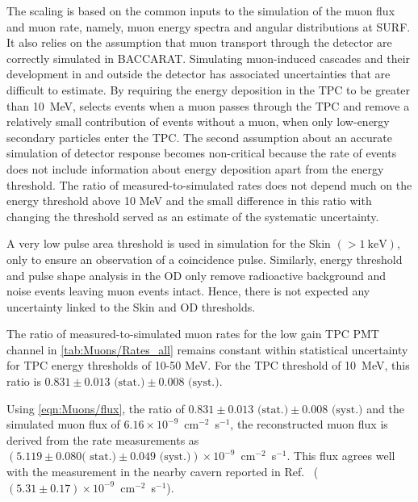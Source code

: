 The scaling is based on the common inputs to the simulation of the muon flux and muon rate, namely, muon energy spectra and angular distributions at SURF. It also relies on the assumption that muon transport through the detector are correctly simulated in BACCARAT. Simulating muon-induced cascades and their development in and outside the detector has associated uncertainties that are difficult to estimate. By requiring the energy deposition in the TPC to be greater than 10~MeV, selects events when a muon passes through the TPC and remove a relatively small contribution of events without a muon, when only low-energy secondary particles enter the TPC. 
The second assumption about an accurate simulation of detector response becomes non-critical because the rate of events does not include information about energy deposition apart from the energy threshold. The ratio of measured-to-simulated rates does not depend much on the energy threshold above 10 MeV and the small difference in this ratio with changing the threshold served as an estimate of the systematic uncertainty. 

A very low pulse area threshold is used in simulation for the Skin $(>1~\text{keV})$, only to ensure an observation of a coincidence pulse. Similarly, energy threshold and pulse shape analysis in the OD only remove radioactive background and noise events leaving muon events intact. Hence, there is not expected any uncertainty linked to the Skin and OD thresholds.

The ratio of measured-to-simulated muon rates for the low gain TPC PMT channel in \autoref{tab:Muons/Rates_all} remains constant within statistical uncertainty for TPC energy thresholds of 10-50 MeV. For the TPC threshold of 10~MeV, this ratio is $0.831 \pm 0.013 \textrm{ (stat.)} \pm 0.008 \textrm{ (syst.)}$. 

Using \autoref{eqn:Muons/flux}, the ratio of $0.831 \pm 0.013 \text{ (stat.)} \pm 0.008 \text{ (syst.)}$ and the simulated muon flux of $6.16 \times10^{-9}$~cm$^{-2}$~s$^{-1}$, the reconstructed muon flux is derived from the rate measurements as $(5.119 \pm 0.080 \textrm{( stat.)} \pm 0.049 \textrm{ (syst.)})\times10^{-9}$~cm$^{-2}$~s$^{-1}$. This flux agrees well with the measurement in the nearby cavern reported in Ref.~\cite{majorana} ($(5.31 \pm 0.17)\times10^{-9}$~cm$^{-2}$~s$^{-1}$).

